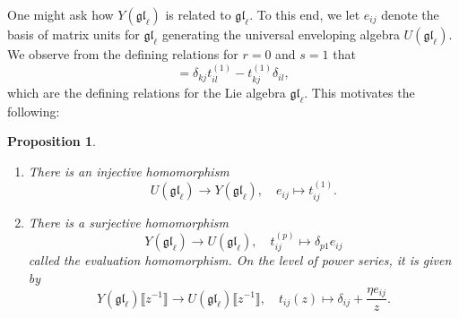 \documentclass[11pt]{report}
\newtheorem{prop}[theorem]{Proposition}
\theoremstyle{definition}
\theoremstyle{remark}
\theoremstyle{remark}
\begin{document}
One might ask how $Y(\mathfrak{gl}_\ell)$ is related to $\mathfrak{gl}_\ell$. To this end, we let $e_{ij}$ denote the basis of matrix units for $\mathfrak{gl}_\ell$ generating the universal enveloping algebra $U(\mathfrak{gl}_\ell)$. We observe from the defining relations for $r=0$ and $s=1$ that
\begin{equation*}
[t_{ij}^{(1)},t_{kl}^{(1)}] = \delta_{kj} t_{il}^{(1)} - t_{kj}^{(1)} \delta_{il},
\end{equation*}
which are the defining relations for the Lie algebra $\mathfrak{gl}_\ell$. This motivates the following:

\begin{prop}
\begin{enumerate}[label=(\roman*)]
\item There is an injective homomorphism
\begin{equation*}
U(\mathfrak{gl}_\ell) \to Y(\mathfrak{gl}_\ell), \quad e_{ij} \mapsto t_{ij}^{(1)}.
\end{equation*}
\item There is a surjective homomorphism
\begin{equation*}
Y(\mathfrak{gl}_\ell) \to U(\mathfrak{gl}_\ell), \quad t_{ij}^{(p)} \mapsto \delta_{p1} e_{ij}
\end{equation*}
called the \emph{evaluation homomorphism}. On the level of power series, it is given by
\begin{equation*}
Y(\mathfrak{gl}_\ell)\llbracket z^{-1} \rrbracket \to U(\mathfrak{gl}_\ell)\llbracket z^{-1} \rrbracket, \quad t_{ij}(z) \mapsto \delta_{ij} + \frac{\eta e_{ij}}{z}.
\end{equation*}
\end{enumerate}
\end{prop}
\end{document}
